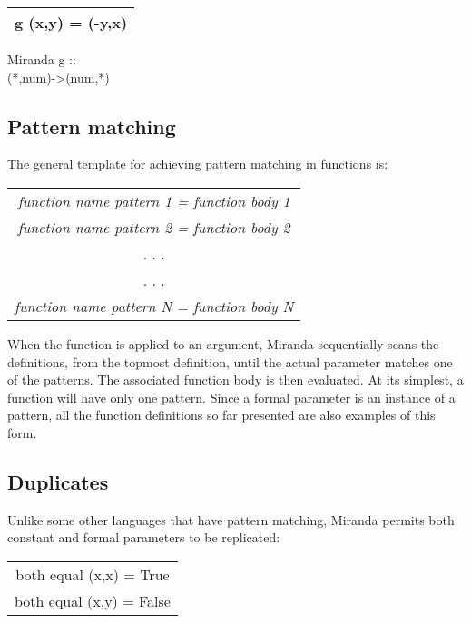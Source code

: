 \documentclass[11pt]{article}
\begin{document}
\begin{center}
    
\begin{tabular}{|c|}

\hline
g (x,y) = (-y,x)\\
\hline

\end{tabular}
\end{center}

\begin{tcolorbox}
Miranda g ::\\
(*,num)->(num,*)
\end{tcolorbox}

\subsection{Pattern matching}

The general template for achieving pattern matching in functions is:

\begin{center}
\begin{tabular}{c}
\textit{
function name pattern 1 = function body 1}\\
\textit{
function name pattern 2 = function body 2}\\
. . .\\
. . .\\
\textit{
function name pattern N = function body N} \\

\end{tabular}
\end{center}

When the function is applied to an argument, Miranda sequentially scans the
definitions, from the topmost definition, until the actual parameter matches one of
the patterns. The associated function body is then evaluated. At its simplest, a
function will have only one pattern. Since a formal parameter is an instance of a
pattern, all the function definitions so far presented are also examples of this form.
\subsection{Duplicates}

Unlike some other languages that have pattern matching, Miranda permits both
constant and formal parameters to be replicated:

\begin{center}
\begin{tabular}{|c|}
\hline
both equal (x,x) = True\\
both equal (x,y) = False\\
\hline
\end{tabular}    
\end{center}
\end{document}
